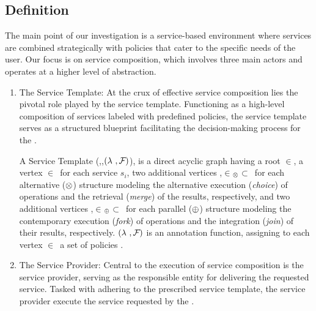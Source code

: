 \subsection{Definition}
The main point of our investigation is a service-based environment where services are combined strategically with policies that cater to the specific needs of the user.
Our focus is on service composition, which involves three main actors and operates at a higher level of abstraction.
\begin{enumerate}
  \item The Service Template:
        At the crux of effective service composition lies the pivotal role played by the service template.
        Functioning as a high-level composition of services labeled with predefined policies,
        the service template serves as a structured blueprint facilitating the decision-making process for the  \user.
        \begin{definition} \label{def:pipeline}
          A Service Template \T(\V,\E,$(\lambda~,\mathcal{F}_{}){}$), is a direct acyclic graph having a root $\in$\V, a vertex $\in$\V\ for each service $s_i$,
          two additional vertices ,$\in$\V$_{\otimes}$$\subset$\V\ for each alternative ($\otimes$) structure modeling the alternative execution (\emph{choice}) of operations and the retrieval (\emph{merge}) of the results,
                respectively, and two additional vertices ,$\in$\V$_{\oplus}$$\subset$\V\ for each parallel ($\oplus$) structure modeling the contemporary execution (\emph{fork}) of operations and the integration (\emph{join}) of their results, respectively. $(\lambda~,\mathcal{F}_{}){}$ is an annotation function, assigning to each vertex $\in$\V\ a set of policies .
        \end{definition}
  \item The Service Provider:
        Central to the execution of service composition is the service provider,
        serving as the responsible entity for delivering the requested service.
        Tasked with adhering to the prescribed service template, the service provider execute the service requested by the \user.
\end{enumerate}


